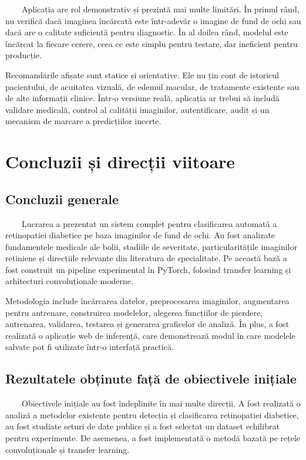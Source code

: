\documentclass[12pt, a4paper, oneside, romanian]{teza-upb}
\begin{document}
\ \ \ \ Aplicația are rol demonstrativ și prezintă mai multe limitări. În primul rând, nu verifică dacă imaginea încărcată este într-adevăr o imagine de fund de ochi sau dacă are o calitate suficientă pentru diagnostic. În al doilea rând, modelul este încărcat la fiecare cerere, ceea ce este simplu pentru testare, dar ineficient pentru producție.
\bigskip

Recomandările afișate sunt statice și orientative. Ele nu țin cont de istoricul pacientului, de acuitatea vizuală, de edemul macular, de tratamente existente sau de alte informații clinice. Într-o versiune reală, aplicația ar trebui să includă validare medicală, control al calității imaginilor, autentificare, audit și un mecanism de marcare a predicțiilor incerte.


\chapter{Concluzii și direcții viitoare}

\section{Concluzii generale}

\ \ \ \ Lucrarea a prezentat un sistem complet pentru clasificarea automată a retinopatiei diabetice pe baza imaginilor de fund de ochi. Au fost analizate fundamentele medicale ale bolii, stadiile de severitate, particularitățile imaginilor retiniene și direcțiile relevante din literatura de specialitate. Pe această bază a fost construit un pipeline experimental în PyTorch, folosind transfer learning și arhitecturi convoluționale moderne.
\bigskip

Metodologia include încărcarea datelor, preprocesarea imaginilor, augmentarea pentru antrenare, construirea modelelor, alegerea funcțiilor de pierdere, antrenarea, validarea, testarea și generarea graficelor de analiză. În plus, a fost realizată o aplicație web de inferență, care demonstrează modul în care modelele salvate pot fi utilizate într-o interfață practică.

\section{Rezultatele obținute față de obiectivele inițiale}

\ \ \ \ Obiectivele inițiale au fost îndeplinite în mai multe direcții. A fost realizată o analiză a metodelor existente pentru detecția și clasificarea retinopatiei diabetice, au fost studiate seturi de date publice și a fost selectat un dataset echilibrat pentru experimente. De asemenea, a fost implementată o metodă bazată pe rețele convoluționale și transfer learning.
\bigskip
\end{document}

